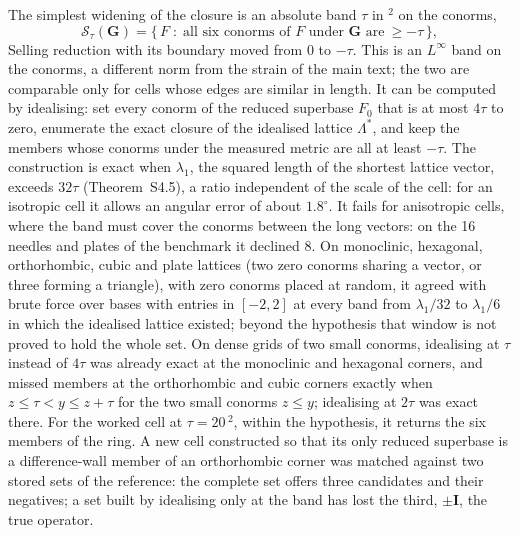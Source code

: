 \documentclass[preprint,pdf]{iucr}          %
\newcommand{\Ang}{\text{\AA}}
\newcommand{\Gmet}{\mathbf{G}}
\newcommand{\Sw}{\mathcal{S}_\tau}
\begin{document}
The simplest widening of the closure is an absolute band $\tau$ in \Ang$^2$ on the conorms,
\begin{equation}
\Sw(\Gmet)=\bigl\{\,F\;:\;\text{all six conorms of }F\text{ under }\Gmet\text{ are}\ \ge-\tau\,\bigr\},
\label{eq:deftau}
\end{equation}
Selling reduction with its boundary moved from $0$ to $-\tau$. This is an $L^\infty$ band on the conorms, a different norm from the strain of the main text; the two are comparable only for cells whose edges are similar in length. It can be computed by idealising: set every conorm of the reduced superbase $F_0$ that is at most $4\tau$ to zero, enumerate the exact closure of the idealised lattice $\Lambda^*$, and keep the members whose conorms under the measured metric are all at least $-\tau$. The construction is exact when $\lambda_1$, the squared length of the shortest lattice vector, exceeds $32\tau$ (Theorem~S4.5), a ratio independent of the scale of the cell: for an isotropic cell it allows an angular error of about $1.8^\circ$. It fails for anisotropic cells, where the band must cover the conorms between the long vectors: on the 16 needles and plates of the benchmark it declined 8. On monoclinic, hexagonal, orthorhombic, cubic and plate lattices (two zero conorms sharing a vector, or three forming a triangle), with zero conorms placed at random, it agreed with brute force over bases with entries in $[-2,2]$ at every band from $\lambda_1/32$ to $\lambda_1/6$ in which the idealised lattice existed; beyond the hypothesis that window is not proved to hold the whole set. On dense grids of two small conorms, idealising at $\tau$ instead of $4\tau$ was already exact at the monoclinic and hexagonal corners, and missed members at the orthorhombic and cubic corners exactly when $z\le\tau<y\le z+\tau$ for the two small conorms $z\le y$; idealising at $2\tau$ was exact there. For the worked cell at $\tau=20$\,\Ang$^2$, within the hypothesis, it returns the six members of the ring. A new cell constructed so that its only reduced superbase is a difference-wall member of an orthorhombic corner was matched against two stored sets of the reference: the complete set offers three candidates and their negatives; a set built by idealising only at the band has lost the third, $\pm\mathbf I$, the true operator.
\end{document}
